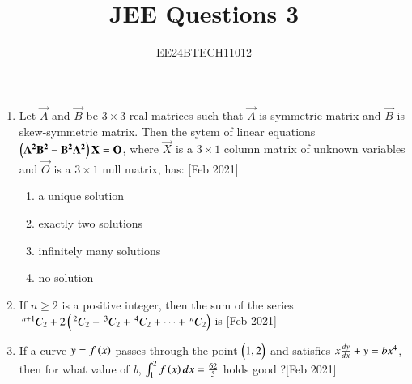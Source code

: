 \documentclass[journal,12pt,onecolumn]{IEEEtran}
\newcommand{\nCr}[2]{\,^{#1}C_{#2}}
\theoremstyle{remark}
\begin{document}

\vspace{3cm}

\title{JEE Questions 3}
\author{EE24BTECH11012}
\maketitle
\newpage
\bigskip

\renewcommand{\thefigure}{\theenumi}
\renewcommand{\thetable}{\theenumi}
\begin{enumerate}
	\item Let $\vec{A}$ and $\vec{B}$ be $3 \times 3$ real matrices such that $\vec{A}$ is symmetric matrix and $\vec{B}$ is skew-symmetric matrix. Then the sytem of linear equations $\left(\mathbf{A^2B^2 - B^2A^2}\right)\mathbf{X} = \mathbf{O}$, where $\vec{X}$ is a $3 \times 1$ column matrix of unknown variables and $\vec{O}$ is a $3 \times 1$ null matrix, has: \hfill{[Feb 2021]} 
		\begin{enumerate}
			\item a unique solution
			\item exactly two solutions
			\item infinitely many solutions
			\item no solution
		\end{enumerate}
	\item If $ n\geq2 $ is a positive integer, then the sum of the series $\nCr{n+1}{2} + 2\brak{\nCr{2}{2} + \nCr{3}{2} + \nCr{4}{2} + \dots + \nCr{n}{2}}$ is \hfill{[Feb 2021]}
		\begin{enumerate}
		\end{enumerate}
	\item If a curve $ y = f\left(x\right) $ passes through the point $\begin{pmatrix}1,2\end{pmatrix}$ and satisfies $ x\frac{dy}{dx} + y = \emph{b}x^4 $, then for what value of \emph{b}, $ \int_{1}^{2} f\left(x\right) dx = \frac{62}{5} $ holds good ?\hfill{[Feb 2021]}
		\begin{enumerate}
				\begin{multicols}{4}
			\item 5
			\item $\frac{62}{5}$

\end{multicols}
\end{enumerate}
\end{enumerate}
\end{document}
